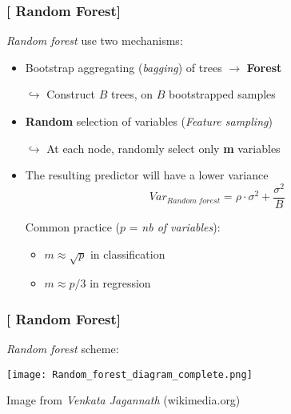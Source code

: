 \documentclass[xcolor=x11names,compress, aspectratio=169]{beamer}
\renewcommand{\(}{\begin{columns}}
\renewcommand{\)}{\end{columns}}
\newcommand{\<}[1]{\begin{column}{#1}}
\renewcommand{\>}{\end{column}}
\begin{document}
\begin{frame}
\frametitle{\textcolor{brique}{[ Random Forest]}}
\textit{Random forest} use two mechanisms:
\pause
\begin{itemize}[<+->]
    \item Bootstrap aggregating (\textit{bagging}) of trees $\rightarrow$ \textcolor{brique}{\textbf{Forest}}
    \item[$\hookrightarrow$] Construct $B$ trees, on $B$ bootstrapped samples
    \item \textcolor{brique}{\textbf{Random}} selection of variables (\textit{Feature sampling})
    \item[$\hookrightarrow$] At each node, randomly select only \textbf{m} variables
    \item The resulting predictor will have a lower variance
    $$
Var_{Random \; forest} = \rho \cdot \sigma^{2} + \frac{\sigma^{2}}{B}
$$

    \item[]Common practice ($p$ =\textit{ nb of variables}):
    \begin{itemize}
        \item $m \approx \sqrt{p}$ in classification
        \item $m \approx p/3$ in regression
    \end{itemize}
\end{itemize}
\end{frame}


\begin{frame}
\frametitle{\textcolor{brique}{[ Random Forest]}}
\textit{Random forest} scheme:
\begin{center}
\texttt{[image: Random\_forest\_diagram\_complete.png]}\\
\end{center}
 \textcolor{gris}{\small Image from  \textit{Venkata Jagannath} (wikimedia.org) }
\end{frame}
\end{document}
